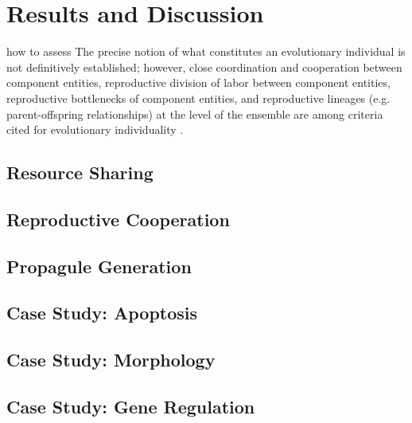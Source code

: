 \section{Results and Discussion}

how to assess
The precise notion of what constitutes an evolutionary individual is not definitively established;
however, close coordination and cooperation between component entities, reproductive division of labor between component entities, reproductive bottlenecks of component entities, and reproductive lineages (e.g. parent-offspring relationships) at the level of the ensemble are among criteria cited for evolutionary individuality
\citep{ereshefsky2015rethinking, bouchard2013symbiotic}.

\subsection{Resource Sharing}



\subsection{Reproductive Cooperation}





\subsection{Propagule Generation}



\subsection{Case Study: Apoptosis}



\subsection{Case Study: Morphology}



\subsection{Case Study: Gene Regulation}

